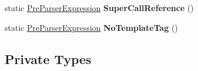 \begin{DoxyCompactItemize}
\item 
static \hyperlink{classv8_1_1internal_1_1_pre_parser_expression}{Pre\+Parser\+Expression} {\bfseries Super\+Call\+Reference} ()\hypertarget{classv8_1_1internal_1_1_pre_parser_expression_a97b57c75f1cb1ef65f4389547813eb4f}{}\label{classv8_1_1internal_1_1_pre_parser_expression_a97b57c75f1cb1ef65f4389547813eb4f}

\item 
static \hyperlink{classv8_1_1internal_1_1_pre_parser_expression}{Pre\+Parser\+Expression} {\bfseries No\+Template\+Tag} ()\hypertarget{classv8_1_1internal_1_1_pre_parser_expression_a393c15bf7dbc62ba1114bcf7997d83e9}{}\label{classv8_1_1internal_1_1_pre_parser_expression_a393c15bf7dbc62ba1114bcf7997d83e9}

\end{DoxyCompactItemize}
\subsection*{Private Types}
